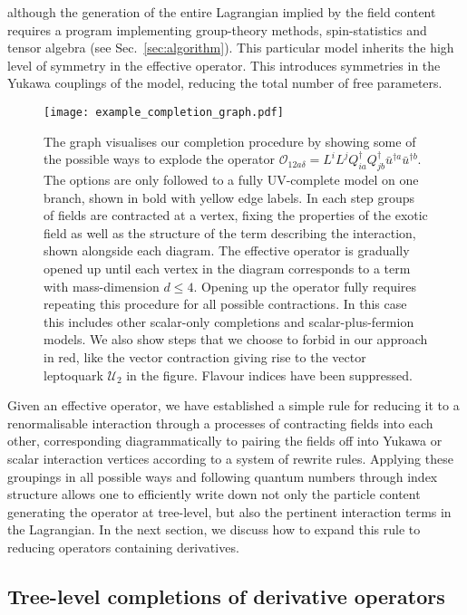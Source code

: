 although the generation of the entire Lagrangian implied by the field content
requires a program implementing group-theory methods, spin-statistics and tensor
algebra (see Sec.~\ref{sec:algorithm}). This particular model inherits the high
level of symmetry in the effective operator. This introduces symmetries in the
Yukawa couplings of the model, reducing the total number of free parameters.

\begin{figure}
  \centering
  \texttt{[image: example\_completion\_graph.pdf]}
  \caption{The graph visualises our completion procedure by showing some of the
    possible ways to explode the operator
    $\mathcal{O}_{12a\delta} = L^{i} L^{j} Q^{\dagger}_{ia} Q^{\dagger}_{jb} \bar{u}^{\dagger a} \bar{u}^{\dagger b}$.
    The options are only followed to a fully UV-complete model on one branch,
    shown in bold with yellow edge labels. In each step groups of fields are
    contracted at a vertex, fixing the properties of the exotic field as well as
    the structure of the term describing the interaction, shown alongside each
    diagram. The effective operator is gradually opened up until each vertex in
    the diagram corresponds to a term with mass-dimension $d \leq 4$. Opening up
    the operator fully requires repeating this procedure for all possible
    contractions. In this case this includes other scalar-only completions and
    scalar-plus-fermion models. We also show steps that we choose to forbid in
    our approach in red, like the vector contraction giving rise to the vector
    leptoquark $\mathcal{U}_{2}$ in the figure. Flavour indices have been
    suppressed.}
  \label{fig:example-completion-graph}
\end{figure}

Given an effective operator, we have established a simple rule for reducing it
to a renormalisable interaction through a processes of contracting fields into
each other, corresponding diagrammatically to pairing the fields off into Yukawa
or scalar interaction vertices according to a system of rewrite rules. Applying
these groupings in all possible ways and following quantum numbers through index
structure allows one to efficiently write down not only the particle content
generating the operator at tree-level, but also the pertinent interaction terms
in the Lagrangian. In the next section, we discuss how to expand this rule to
reducing operators containing derivatives.

\subsection{Tree-level completions of derivative operators}
\label{sec:derivatives}

